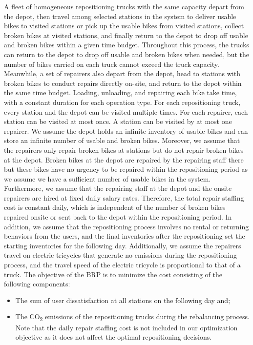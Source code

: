 A fleet of homogeneous repositioning trucks with the same capacity depart from the depot, then
travel among selected stations in the system to deliver usable bikes to visited stations or pick up
the usable bikes from visited stations, collect broken bikes at visited stations, and finally return
to the depot to drop off usable and broken bikes within a given time budget. Throughout this
process, the trucks can return to the depot to drop off usable and broken bikes when needed, but the
number of bikes carried on each truck cannot exceed the truck capacity. Meanwhile, a set of
repairers also depart from the depot, head to stations with broken bikes to conduct repairs directly
on-site, and return to the depot within the same time budget. Loading, unloading, and repairing each
bike take time, with a constant duration for each operation type. For each repositioning truck,
every station and the depot can be visited multiple times. For each repairer, each station can be
visited at most once. A station can be visited by at most one repairer. We assume the depot holds an
infinite inventory of usable bikes and can store an infinite number of usable and broken bikes.
Moreover, we assume that the repairers only repair broken bikes at stations but do not repair broken
bikes at the depot. Broken bikes at the depot are repaired by the repairing staff there but these
bikes have no urgency to be repaired within the repositioning period as we assume we have a
sufficient number of usable bikes in the system. Furthermore, we assume that the repairing staff at
the depot and the onsite repairers are hired at fixed daily salary rates. Therefore, the total
repair staffing cost is constant daily, which is independent of the number of broken bikes repaired
onsite or sent back to the depot within the repositioning period. In addition, we assume that the
repositioning process involves no rental or returning behaviors from the users, and the final
inventories after the repositioning set the starting inventories for the following day.
Additionally, we assume the repairers travel on electric tricycles that generate no emissions during
the repositioning process, and the travel speed of the electric tricycle is proportional to that of
a truck. The objective of the BRP is to minimize the cost consisting of the following components:

\begin{itemize}
\item
  The sum of user dissatisfaction at all stations on the following day and;
\item
  The CO\textsubscript{2} emissions of the repositioning trucks during the rebalancing process.
  Note that the daily repair staffing cost is not included in our optimization objective as it does
  not affect the optimal repositioning decisions.
\end{itemize}


